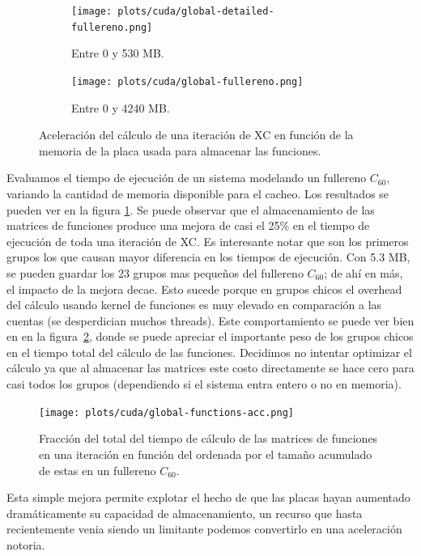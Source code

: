 \begin{figure}[htbp]
   \centering
   \begin{subfigure}[b]{\plotwidthtres}
     \texttt{[image: plots/cuda/global-detailed-fullereno.png]}
     \caption{Entre 0 y 530 MB.}
   \end{subfigure}
   \begin{subfigure}[b]{\plotwidthtres}
     \texttt{[image: plots/cuda/global-fullereno.png]}
     \caption{Entre 0 y 4240 MB.}
   \end{subfigure}
   \caption{Aceleraci\'on del c\'alculo de una iteraci\'on de XC en funci\'on de la memoria de
   la placa usada para almacenar las funciones.}
   \label{fig:global-fullereno}
\end{figure}

Evaluamos el tiempo de ejecuci\'on de un sistema modelando un fullereno $C_{60}$, variando la
cantidad de memoria disponible para el cacheo. Los resultados se pueden ver en la figura \ref{fig:global-fullereno}.
Se puede observar que el almacenamiento de las matrices de funciones produce una mejora de casi el 25\% en el tiempo de ejecuci\'on
de toda una iteraci\'on de XC. Es interesante notar que son los primeros grupos los que causan mayor
diferencia en los tiempos de ejecuci\'on. Con 5.3 MB, se pueden guardar los 23 grupos mas peque\~nos del
fullereno $C_{60}$; de ah\'i en m\'as, el impacto de la mejora decae. Esto sucede porque en grupos
chicos el overhead del c\'alculo usando kernel de funciones es muy elevado en comparaci\'on a las
cuentas (se desperdician muchos threads). Este comportamiento se puede ver
bien en en la figura~\ref{fig:runtime-functions-fullereno}, donde se puede apreciar el importante
peso de los grupos chicos en el tiempo total del c\'alculo de las funciones. Decidimos no intentar
optimizar el c\'alculo ya que al almacenar las matrices este costo directamente se hace cero para
casi todos los grupos (dependiendo si el sistema entra entero o no en memoria).

\begin{figure}[htbp]
   \centering
   \texttt{[image: plots/cuda/global-functions-acc.png]}
   \caption{Fracci\'on del total del tiempo de c\'alculo de las matrices de funciones en una iteraci\'on en funci\'on
   del ordenada por el tama\~no acumulado de estas en un fullereno $C_{60}$.}
   \label{fig:runtime-functions-fullereno}
\end{figure}

Esta simple mejora permite explotar el hecho de que las placas hayan aumentado dram\'aticamente su
capacidad de almacenamiento, un recurso que hasta recientemente venia siendo un limitante podemos
convertirlo en una aceleraci\'on notoria.

